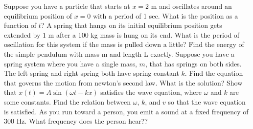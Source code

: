 \documentclass[12pt]{article}
\begin{document}
\pagestyle{empty}
\noindent Suppose you have a particle that starts at $x=2$ m and oscillates around an equilibrium position of $x=0$ with a period of 1 sec.  What is the position as a function of $t$?
\newpage
\noindent A spring that hangs on its initial equilibrium position gets extended by 1 m after a 100 kg mass is hung on its end. What is the period of oscillation for this system if the mass is pulled down a little? 
\newpage
\noindent Find the energy of the simple pendulum with mass m and length L exactly.  
\newpage
\noindent Suppose you have a spring system where you have a single mass, $m$, that has springs on both sides.  The left spring and right spring both have spring constant $k$.  Find the equation that governs the motion from newton's second law.  What is the solution? 
\newpage 
\noindent Show that $x(t) = A\sin(\omega t - k x)$ satisfies the wave equation, where $\omega$ and $k$ are some constants.  Find the relation between $\omega$, $k$, and $v$ so that the wave equation is satisfied.
\newpage
\noindent As you run toward a person, you emit a sound at a fixed frequency of 300 Hz. What frequency does the person hear?? 
\end{document}
